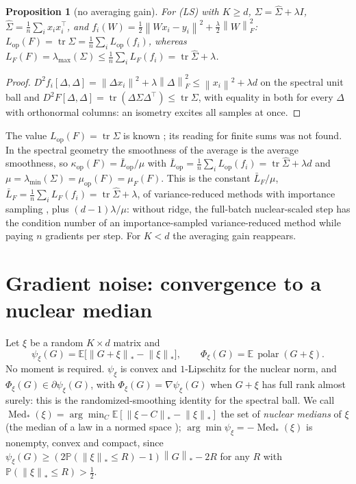 \documentclass[11pt]{article}
\newtheorem{proposition}[theorem]{Proposition}
\newcommand{\E}{\mathbb{E}}
\newcommand{\Prob}{\mathbb{P}}
\newcommand{\norm}[1]{\left\|#1\right\|}
\newcommand{\nnuc}[1]{\left\|#1\right\|_{*}}
\newcommand{\nF}[1]{\left\|#1\right\|_{F}}
\newcommand{\tr}{\operatorname{tr}}
\newcommand{\polar}{\operatorname{polar}}
\newcommand{\Med}{\operatorname{Med}_\ast}
\newcommand{\Lop}{L_{\mathrm{op}}}
\newcommand{\muop}{\mu_{\mathrm{op}}}
\newcommand{\kop}{\kappa_{\mathrm{op}}}
\newcommand{\lmin}{\lambda_{\min}}
\newcommand{\lmax}{\lambda_{\max}}
\begin{document}
\begin{proposition}[no averaging gain]\label{prop:avg}
For (LS) with $K\ge d$, $\Sigma=\hat\Sigma+\lambda I$, $\hat\Sigma=\frac1n\sum_ix_ix_i^\top$, and
$f_i(W)=\frac12\norm{Wx_i-y_i}^2+\frac\lambda2\nF W^2$:
$\Lop(F)=\tr\Sigma=\frac1n\sum_i\Lop(f_i)$, whereas $L_F(F)=\lmax(\Sigma)\le\frac1n\sum_iL_F(f_i)=\tr\hat\Sigma+\lambda$.
\end{proposition}
\begin{proof}
$D^2f_i[\Delta,\Delta]=\norm{\Delta x_i}^2+\lambda\nF\Delta^2\le\norm{x_i}^2+\lambda d$ on the spectral unit ball and
$D^2F[\Delta,\Delta]=\tr(\Delta\Sigma\Delta^\top)\le\tr\Sigma$, with equality in both for every $\Delta$ with
orthonormal columns: an isometry excites all samples at once.
\end{proof}
The value $\Lop(F)=\tr\Sigma$ is known \cite{davis2025spectral}; its reading for finite sums was not found. In the
spectral geometry the smoothness of the average is the average smoothness, so $\kop(F)=\bar L_{\mathrm{op}}/\mu$ with
$\bar L_{\mathrm{op}}=\frac1n\sum_i\Lop(f_i)=\tr\hat\Sigma+\lambda d$ and $\mu=\lmin(\Sigma)=\muop(F)=\mu_F(F)$. This
is the constant
$\bar L_F/\mu$, $\bar L_F=\frac1n\sum_iL_F(f_i)=\tr\hat\Sigma+\lambda$, of variance-reduced methods with importance
sampling \cite{xiao2014proximal}, plus $(d-1)\lambda/\mu$: without ridge, the full-batch nuclear-scaled step has the
condition number of an importance-sampled variance-reduced method while paying $n$ gradients per step. For $K<d$ the
averaging gain reappears.

\section{Gradient noise: convergence to a nuclear median}\label{sec:noise}

Let $\xi$ be a random $K\times d$ matrix and
\[
\psi_\xi(G)=\E\big[\nnuc{G+\xi}-\nnuc\xi\big],\qquad \Phi_\xi(G)=\E\,\polar(G+\xi).
\]
No moment is required. $\psi_\xi$ is convex and $1$-Lipschitz for the nuclear norm, and
$\Phi_\xi(G)\in\partial\psi_\xi(G)$, with $\Phi_\xi(G)=\nabla\psi_\xi(G)$ when $G+\xi$ has full rank almost surely: this
is the randomized-smoothing identity \cite{duchi2012randomized,jiang2026adaptive} for the spectral ball. We call
$\Med(\xi)=\arg\min_C\E[\nnuc{\xi-C}-\nnuc\xi]$ the set of \emph{nuclear medians} of $\xi$ (the median of a law in a
normed space \cite{minsker2015geometric}); $\arg\min\psi_\xi=-\Med(\xi)$ is nonempty, convex and compact, since
$\psi_\xi(G)\ge(2\Prob(\nnuc\xi\le R)-1)\nnuc G-2R$ for any $R$ with $\Prob(\nnuc\xi\le R)>\frac12$.
\end{document}
